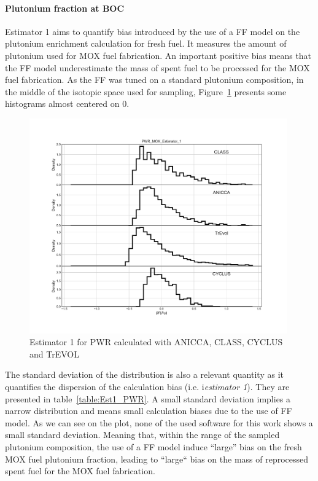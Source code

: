 \paragraph{Plutonium fraction at \gls{BOC}}

Estimator 1 aims to quantify bias introduced by the use of a \gls{FF} model on
the plutonium enrichment calculation for fresh fuel. It measures the amount of
plutonium used for \gls{MOX} fuel fabrication. An important positive bias means
that the \gls{FF} model underestimate the mass of spent fuel to be processed for
the MOX fuel fabrication. As the \gls{FF} was tuned on a standard plutonium
composition, in the middle of the isotopic space used for sampling,
Figure~\ref{fig:Est1_PWR} presents some histograms almost centered on 0.
        

\begin{figure}[h]
	\begin{center}
		\includegraphics[width = 0.99\textwidth]{../../Feature_1/RAW_DATA/FIG/PWR_MOX_Estimator_1.pdf}
		\caption{Estimator 1 for \gls{PWR} calculated with ANICCA, CLASS, CYCLUS and TrEVOL}
		\label{fig:Est1_PWR}
	\end{center}
\end{figure}

The standard deviation of the distribution is also a relevant quantity as it
quantifies the dispersion of the calculation bias (i.e. i\textit{estimator 1}).
They are presented in table~\ref{table:Est1_PWR}. A small standard deviation
implies a narrow distribution and means small calculation biases due to the use
of \gls{FF} model. As we can see on the plot, none of the used software for this
work shows a small standard deviation. Meaning that, within the range of the
sampled plutonium composition, the use of a \gls{FF} model induce ``large'' bias
on the fresh \gls{MOX} fuel plutonium fraction, leading to ``large`` bias on the
mass of reprocessed spent fuel for the \gls{MOX} fuel fabrication.

